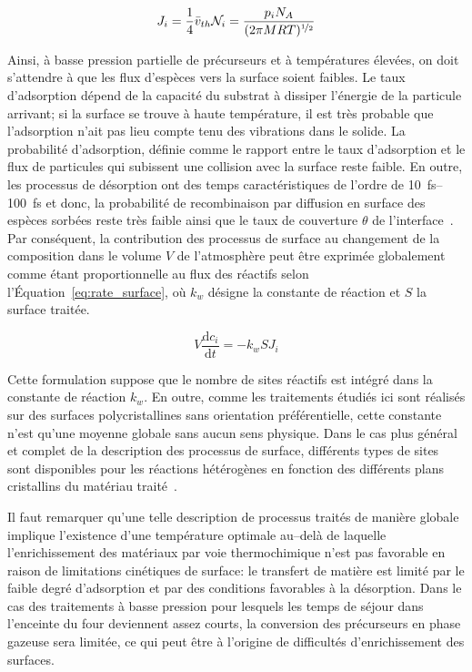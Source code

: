 \clearpage

\begin{equation}
  J_{i}=\frac{1}{4}\bar{v}_{th}\mathcal{N}_{i}=
  \frac{p_{i}N_{A}}{(2\pi{MRT})^{\nicefrac{1}{2}}}
  \label{eq:surface_flux}
\end{equation}

Ainsi, à basse pression partielle de précurseurs et à températures élevées, on doit s'attendre à que les flux d'espèces vers la surface soient faibles. Le taux d'adsorption dépend de la capacité du substrat à dissiper l'énergie de la particule arrivant; si la surface se trouve à haute température, il est très probable que l'adsorption n'ait pas lieu compte tenu des vibrations dans le solide. La probabilité d'adsorption, définie comme le rapport entre le taux d'adsorption et le flux de particules qui subissent une collision avec la surface reste faible. En outre, les processus de désorption ont des temps caractéristiques de l'ordre de \SIrange{10}{100}{\femto\second} et donc, la probabilité de recombinaison par diffusion en surface des espèces sorbées reste très faible ainsi que le taux de couverture $\theta$ de l'interface~\cite{Atkins2006}. Par conséquent, la contribution des processus de surface au changement de la composition dans le volume $V$ de l'atmosphère peut être exprimée globalement comme étant proportionnelle au flux des réactifs selon l'Équation~\ref{eq:rate_surface}, où $k_{w}$ désigne la constante de réaction et $S$ la surface traitée. 

\begin{equation}
V\frac{\mathrm{d}c_i}{\mathrm{d}t}=-k_{w}S{J_{i}}
\label{eq:rate_surface}
\end{equation}

Cette formulation suppose que le nombre de sites réactifs est intégré dans la constante de réaction $k_{w}$. En outre, comme les traitements étudiés ici sont réalisés sur des surfaces polycristallines sans orientation préférentielle, cette constante n'est qu'une moyenne globale sans aucun sens physique. Dans le cas plus général et complet de la description des processus de surface, différents types de sites sont disponibles pour les réactions hétérogènes en fonction des différents plans cristallins du matériau traité~\cite{Alcock2001}. 

Il faut remarquer qu'une telle description de processus traités de manière globale implique l'existence d'une température optimale au--delà de laquelle l'enrichissement des matériaux par voie thermochimique n'est pas favorable en raison de limitations cinétiques de surface: le transfert de matière est limité par le faible degré d'adsorption et par des conditions favorables à la désorption. Dans le cas des traitements à basse pression pour lesquels les temps de séjour dans l'enceinte du four deviennent assez courts, la conversion des précurseurs en phase gazeuse sera limitée, ce qui peut être à l'origine de difficultés d'enrichissement des surfaces.%

